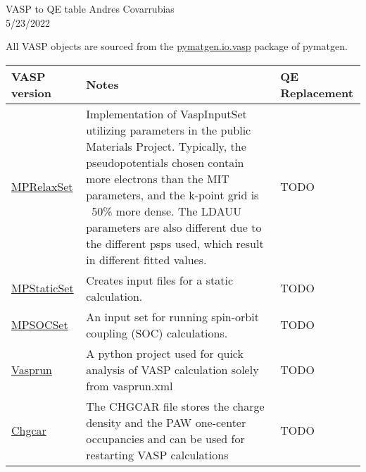 \documentclass[12pt]{article}
\begin{document}
\noindent VASP to QE table \hfill Andres Covarrubias    \\
5/23/2022

\hrulefill


All VASP objects are sourced from the \href{https://pymatgen.org/pymatgen.io.vasp.html?highlight=io\%20vasp\#module-pymatgen.io.vasp}{pymatgen.io.vasp} package of pymatgen. 
\begin{center}
\begin{table}[ht]
\begin{tabularx}{\linewidth}{|>{\RaggedRight}p{2.5cm}|x|x|}\hline
 VASP version & Notes & QE Replacement \\ \hline
 
 \href{https://pymatgen.org/pymatgen.io.vasp.sets.html?highlight=mprelaxset#pymatgen.io.vasp.sets.MPRelaxSet}{MPRelaxSet} & 
 Implementation of VaspInputSet utilizing parameters in the public Materials Project. Typically, the pseudopotentials chosen contain more electrons than the MIT parameters, and the k-point grid is ~50\% more dense. The LDAUU parameters are also different due to the different psps used, which result in different fitted values. & 
 TODO \\ \hline
 
 \href{https://pymatgen.org/pymatgen.io.vasp.sets.html?highlight=mpstaticset#pymatgen.io.vasp.sets.MPStaticSet}{MPStaticSet} &
Creates input files for a static calculation. &
 TODO \\ \hline
 
 \href{https://pymatgen.org/pymatgen.io.vasp.sets.html?highlight=mpsocset#pymatgen.io.vasp.sets.MPSOCSet}{MPSOCSet} &
 An input set for running spin-orbit coupling (SOC) calculations. &
 TODO \\ \hline
 
 \href{https://vasprun-xml.readthedocs.io/en/latest/}{Vasprun} &
 A python project used for quick analysis of VASP calculation solely from vasprun.xml &
 TODO \\ \hline
 
 \href{https://www.vasp.at/wiki/index.php/CHGCAR}{Chgcar} &
 The CHGCAR file stores the charge density and the PAW one-center occupancies and can be used for restarting VASP calculations &
 TODO \\ \hline
 

\end{tabularx}
\end{table}
\end{center}
\end{document}
